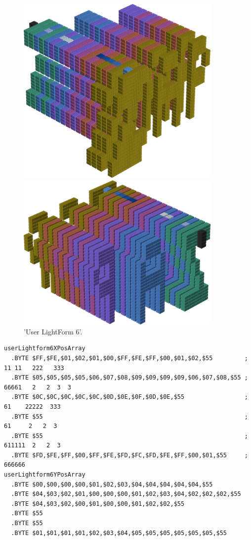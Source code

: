 \begin{figure}[H]
    \centering
    \begin{adjustbox}{width=10cm,center}
      \includegraphics[width=10cm]{src/colorspace_patterns/pattern14-45.png}%
    \end{adjustbox}
    \begin{adjustbox}{width=10cm}
      \includegraphics[width=10cm]{src/colorspace_patterns/pattern14-225.png}%
    \end{adjustbox}
\caption{'User LightForm 6'.}
\end{figure}
\clearpage

\begin{lstlisting}[basicstyle=\ttfamily\tiny]
userLightform6XPosArray
  .BYTE $FF,$FE,$01,$02,$01,$00,$FF,$FE,$FF,$00,$01,$02,$55         ;   11 11   222   333 
  .BYTE $05,$05,$05,$05,$06,$07,$08,$09,$09,$09,$09,$06,$07,$08,$55 ;  66661   2   2  3  3
  .BYTE $0C,$0C,$0C,$0C,$0C,$0D,$0E,$0F,$0D,$0E,$55                 ;    61    22222  333 
  .BYTE $55                                                         ;   61     2   2  3   
  .BYTE $55                                                         ;  611111  2   2  3   
  .BYTE $FD,$FE,$FF,$00,$FF,$FE,$FD,$FC,$FD,$FE,$FF,$00,$01,$55     ; 666666              
userLightform6YPosArray
  .BYTE $00,$00,$00,$00,$01,$02,$03,$04,$04,$04,$04,$04,$55
  .BYTE $04,$03,$02,$01,$00,$00,$00,$01,$02,$03,$04,$02,$02,$02,$55
  .BYTE $04,$03,$02,$00,$01,$00,$00,$01,$02,$02,$55
  .BYTE $55
  .BYTE $55
  .BYTE $01,$01,$01,$01,$02,$03,$04,$05,$05,$05,$05,$05,$05,$55
\end{lstlisting}



